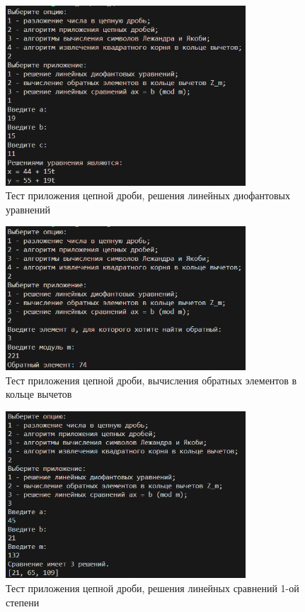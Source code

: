 \documentclass[bachelor, och, labwork]{shiza}
\begin{document}
        \begin{figure}[H]
            \centering
            \includegraphics[width=0.8\textwidth]{pic/2.png}
            \caption{Тест приложения цепной дроби, решения линейных диофантовых уравнений}
        \end{figure}

        \begin{figure}[H]
            \centering
            \includegraphics[width=0.8\textwidth]{pic/3.png}
            \caption{Тест приложения цепной дроби, вычисления обратных элементов в кольце вычетов}
        \end{figure}

        \begin{figure}[H]
            \centering
            \includegraphics[width=0.8\textwidth]{pic/4.png}
            \caption{Тест приложения цепной дроби, решения линейных сравнений 1-ой степени}
        \end{figure}
\end{document}

